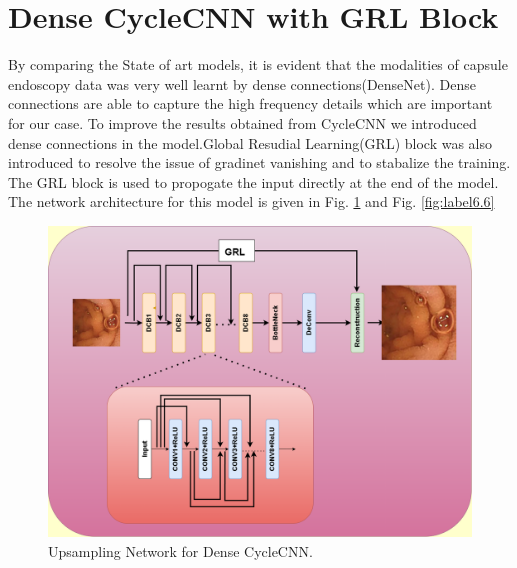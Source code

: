  

\section{Dense CycleCNN with GRL Block}
By comparing the State of art models, it is evident that the modalities of capsule endoscopy data was very well learnt by dense connections(DenseNet). Dense connections are able to capture the high frequency details which are important for our case. To improve the results obtained from CycleCNN we introduced dense connections in the model.Global Resudial Learning(GRL) block was also introduced to resolve the issue of gradinet vanishing and to stabalize the training. The GRL block is used to propogate the input directly at the end of the model.  The network architecture for this model is given in Fig. \ref{fig:label6.4} and Fig. \ref{fig:label6.6}

\begin{figure}[H]
    \centering
    \includegraphics[totalheight=4.5in]{Chapter6/DenseGRL_UP.png}
    \caption[Upsampling Network for Dense CycleCNN]{Upsampling Network for Dense CycleCNN.}
    \label{fig:label6.4}
\end{figure}

